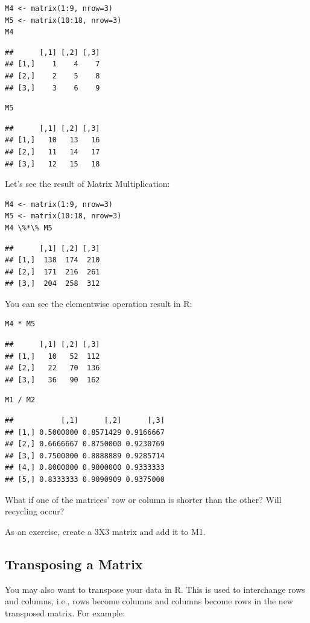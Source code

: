 \documentclass[12pt]{book}
\begin{document}
\begin{verbatim}
M4 <- matrix(1:9, nrow=3)
M5 <- matrix(10:18, nrow=3)
M4
\end{verbatim}
\begin{verbatim}
##      [,1] [,2] [,3]
## [1,]    1    4    7
## [2,]    2    5    8
## [3,]    3    6    9
\end{verbatim}
\begin{verbatim}
M5
\end{verbatim}
\begin{verbatim}
##      [,1] [,2] [,3]
## [1,]   10   13   16
## [2,]   11   14   17
## [3,]   12   15   18
\end{verbatim}
Let's see the result of Matrix Multiplication:

\begin{verbatim}
M4 <- matrix(1:9, nrow=3)
M5 <- matrix(10:18, nrow=3)
M4 \%*\% M5
\end{verbatim}
\begin{verbatim}
##      [,1] [,2] [,3]
## [1,]  138  174  210
## [2,]  171  216  261
## [3,]  204  258  312
\end{verbatim}
You can see the elementwise operation result in R:

\begin{verbatim}
M4 * M5
\end{verbatim}
\begin{verbatim}
##      [,1] [,2] [,3]
## [1,]   10   52  112
## [2,]   22   70  136
## [3,]   36   90  162
\end{verbatim}
\begin{verbatim}
M1 / M2
\end{verbatim}
\begin{verbatim}
##           [,1]      [,2]      [,3]
## [1,] 0.5000000 0.8571429 0.9166667
## [2,] 0.6666667 0.8750000 0.9230769
## [3,] 0.7500000 0.8888889 0.9285714
## [4,] 0.8000000 0.9000000 0.9333333
## [5,] 0.8333333 0.9090909 0.9375000
\end{verbatim}
What if one of the matrices' row or column is shorter than the other? Will recycling occur?

As an exercise, create a 3X3 matrix and add it to M1.

\subsection{Transposing a Matrix}
You may also want to transpose your data in R. This is used to interchange rows and columns, i.e., rows become columns and columns become rows in the new transposed matrix. For example:
\end{document}
